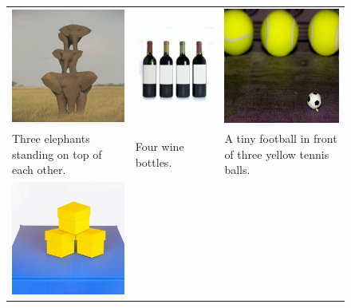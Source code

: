 
\begin{figure}
  \centering
  \begin{tabular}{p{50mm}p{50mm}p{50mm}}
    \includegraphics[width=50mm]{figs/verticals/cardinality_00430_maskgit_sresg1r1} &
    \includegraphics[width=50mm]{figs/verticals/cardinality_00708_maskgit_sresg1r1} &
    \includegraphics[width=50mm]{figs/verticals/cardinality_00087_maskgit_sresg1r1}
    \\
    \small Three elephants standing on top of each other. &
    \small Four wine bottles. &
    \small A tiny football in front of three yellow tennis balls.
    \\
    \includegraphics[width=50mm]{figs/verticals/composition_00678_maskgit_sresg1r1} &

\end{tabular}
\end{figure}
